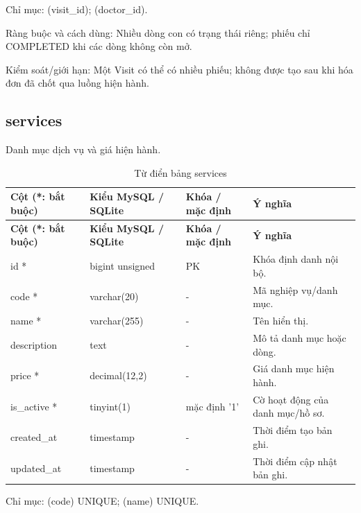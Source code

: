 Chỉ mục:\allowbreak{} (visit\_\allowbreak{}id); (doctor\_\allowbreak{}id).\allowbreak{}

Ràng buộc và cách dùng:\allowbreak{} Nhiều dòng con có trạng thái riêng; phiếu chỉ COMPLETED khi các dòng không còn mở.\allowbreak{}

Kiểm soát/\allowbreak{}giới hạn:\allowbreak{} Một Visit có thể có nhiều phiếu; không được tạo sau khi hóa đơn đã chốt qua luồng hiện hành.\allowbreak{}

\clearpage

\subsection{services}
Danh mục dịch vụ và giá hiện hành.\allowbreak{}


{\fontsize{10}{12}\selectfont\setlength{\tabcolsep}{3pt}\renewcommand{\arraystretch}{1.12}
\begin{longtable}{@{}L{\textwidth-4.86pt\relax} L{\textwidth-3.96pt\relax} L{\textwidth-2.88pt\relax} L{\textwidth-6.3pt\relax}@{}}
\caption{Từ điển bảng services}\\
\toprule
\textbf{Cột (*:\allowbreak{} bắt buộc)} & \textbf{Kiểu My\allowbreak{}SQL /\allowbreak{} SQLite} & \textbf{Khóa /\allowbreak{} mặc định} & \textbf{Ý nghĩa}\\\midrule
\endfirsthead
\toprule
\textbf{Cột (*:\allowbreak{} bắt buộc)} & \textbf{Kiểu My\allowbreak{}SQL /\allowbreak{} SQLite} & \textbf{Khóa /\allowbreak{} mặc định} & \textbf{Ý nghĩa}\\\midrule
\endhead
\bottomrule\endlastfoot
id * & bigint unsigned & PK & Khóa định danh nội bộ.\allowbreak{}\\[1pt]
code * & varchar(20) & - & Mã nghiệp vụ/\allowbreak{}danh mục.\allowbreak{}\\[1pt]
name * & varchar(255) & - & Tên hiển thị.\allowbreak{}\\[1pt]
description & text & - & Mô tả danh mục hoặc dòng.\allowbreak{}\\[1pt]
price * & decimal(12,2) & - & Giá danh mục hiện hành.\allowbreak{}\\[1pt]
is\_\allowbreak{}active * & tinyint(1) & mặc định '1' & Cờ hoạt động của danh mục/\allowbreak{}hồ sơ.\allowbreak{}\\[1pt]
created\_\allowbreak{}at & timestamp & - & Thời điểm tạo bản ghi.\allowbreak{}\\[1pt]
updated\_\allowbreak{}at & timestamp & - & Thời điểm cập nhật bản ghi.\allowbreak{}\\[1pt]
\end{longtable}}
Chỉ mục:\allowbreak{} (code) UNIQUE; (name) UNIQUE.\allowbreak{}

